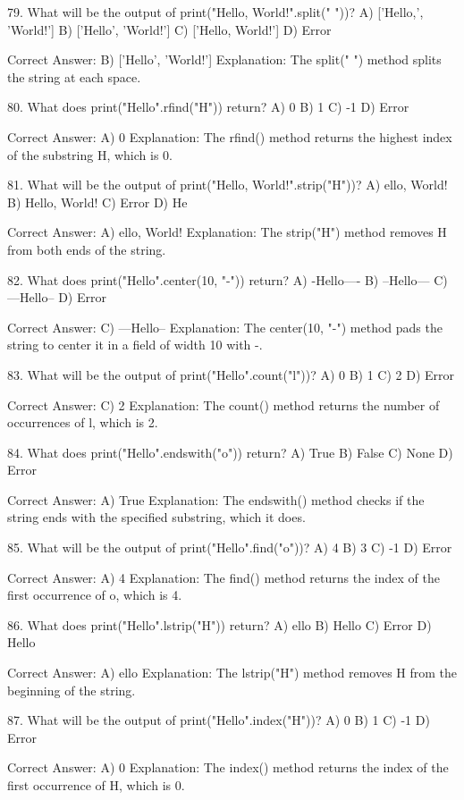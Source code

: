 79. What will be the output of print("Hello, World!".split(" "))?
A) ['Hello,', 'World!']
B) ['Hello', 'World!']
C) ['Hello, World!']
D) Error

Correct Answer: B) ['Hello', 'World!']
Explanation: The split(" ") method splits the string at each space.

80. What does print("Hello".rfind("H")) return?
A) 0
B) 1
C) -1
D) Error

Correct Answer: A) 0
Explanation: The rfind() method returns the highest index of the substring H, which is 0.

81. What will be the output of print("Hello, World!".strip("H"))?
A) ello, World!
B) Hello, World!
C) Error
D) He

Correct Answer: A) ello, World!
Explanation: The strip("H") method removes H from both ends of the string.

82. What does print("Hello".center(10, "-")) return?
A) -Hello----
B) --Hello---
C) ---Hello--
D) Error

Correct Answer: C) ---Hello--
Explanation: The center(10, "-") method pads the string to center it in a field of width 10 with -.

83. What will be the output of print("Hello".count("l"))?
A) 0
B) 1
C) 2
D) Error

Correct Answer: C) 2
Explanation: The count() method returns the number of occurrences of l, which is 2.

84. What does print("Hello".endswith("o")) return?
A) True
B) False
C) None
D) Error

Correct Answer: A) True
Explanation: The endswith() method checks if the string ends with the specified substring, which it does.

85. What will be the output of print("Hello".find("o"))?
A) 4
B) 3
C) -1
D) Error

Correct Answer: A) 4
Explanation: The find() method returns the index of the first occurrence of o, which is 4.

86. What does print("Hello".lstrip("H")) return?
A) ello
B) Hello
C) Error
D) Hello

Correct Answer: A) ello
Explanation: The lstrip("H") method removes H from the beginning of the string.

87. What will be the output of print("Hello".index("H"))?
A) 0
B) 1
C) -1
D) Error

Correct Answer: A) 0
Explanation: The index() method returns the index of the first occurrence of H, which is 0.

